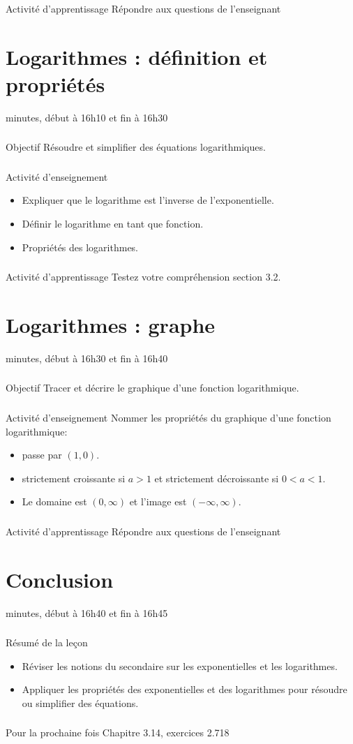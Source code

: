 \documentclass[12pt]{article}
\newcommand\mysection[1]{\section{\sffamily #1}}
\newcommand\mysubsubsection[1]{\subsubsection{\sffamily #1}}
\begin{document}
\mysubsubsection*{\faCalculator{} Activité d'apprentissage}
Répondre aux questions de l'enseignant


\clearpage
\mysection{Logarithmes : définition et propriétés}
 minutes, début à 16h10 et fin à 16h30
\mysubsubsection*{\faBullseye{} Objectif}
Résoudre et simplifier des équations logarithmiques.
\mysubsubsection*{\faChalkboardTeacher{} Activité d'enseignement}
\begin{itemize}
    \item Expliquer que le logarithme est l'inverse de l'exponentielle.
    \item Définir le logarithme en tant que fonction.
    \item Propriétés des logarithmes.
\end{itemize}
\mysubsubsection*{\faCalculator{} Activité d'apprentissage}
Testez votre compréhension section 3.2.


\clearpage
\mysection{Logarithmes : graphe}
 minutes, début à 16h30 et fin à 16h40
\mysubsubsection*{\faBullseye{} Objectif}
Tracer et décrire le graphique d'une fonction logarithmique.
\mysubsubsection*{\faChalkboardTeacher{} Activité d'enseignement}
Nommer les propriétés du graphique d'une fonction logarithmique:
\begin{itemize}
\item passe par $(1,0)$.
\item strictement croissante si $a > 1$ et strictement décroissante si $0 < a < 1$.
\item Le domaine est $(0, \infty)$ et l'image est $(-\infty, \infty)$.
\end{itemize}

\mysubsubsection*{\faCalculator{} Activité d'apprentissage}
Répondre aux questions de l'enseignant

\clearpage
\mysection{Conclusion}
 minutes, début à 16h40 et fin à 16h45
\mysubsubsection*{\faList{} Résumé de la leçon}
\begin{itemize}
    \item Réviser les notions du secondaire sur les exponentielles et les logarithmes.
    \item Appliquer les propriétés des exponentielles et des logarithmes pour résoudre ou simplifier des équations.
\end{itemize}
\mysubsubsection*{\faCalendar*[regular]{} Pour la prochaine fois}
Chapitre 3.14, exercices 2.718
\end{document}
